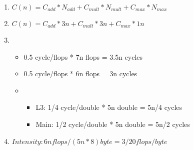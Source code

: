 \documentclass{article}
\begin{document}
\begin{enumerate}[label=(\alph*)]
    \item $C(n) = C_{add} * N_{add} + C_{mult} * N_{mult} + C_{max} * N_{max}$
    \item $C(n) = C_{add} * 3n + C_{mult} * 3n + C_{max} * 1n$
    \item \begin{itemize}
        \item 0.5 cycle/flops * 7n flops = 3.5n cycles
        \item 0.5 cycle/flops * 6n flops = 3n cycles
        \item \begin{itemize}
            \item L3: 1/4 cycle/double * 5n double = 5n/4 cycles
            \item Main: 1/2 cycle/double * 5n double = 5n/2 cycles
        \end{itemize}
    \end{itemize}
    \item $Intensity: 6n flops / (5n * 8) byte = 3/20 flops / byte$
        
\end{enumerate}
\end{document}
